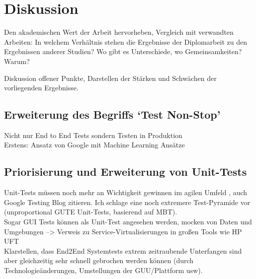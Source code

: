 \makeatletter\ifthesis@masterthesis
\chapter{Diskussion}
\label{sec:discussion}

Den akademischen Wert der Arbeit hervorheben, Vergleich mit verwandten Arbeiten: In welchem Verhältnis stehen die Ergebnisse der Diplomarbeit zu den Ergebnissen anderer Studien? Wo gibt es Unterschiede, wo Gemeinsamkeiten? Warum?

Diskussion offener Punkte, Darstellen der Stärken und Schwächen der vorliegenden Ergebnisse.


\section{Erweiterung des Begriffs `Test Non-Stop'}
Nicht nur End to End Tests sondern Testen in Produktion\\
Erstens: Ansatz von Google mit Machine Learning Ansätze

\section{Priorisierung und Erweiterung von Unit-Tests}
\label{sec:discussion_unit}
Unit-Tests müssen noch mehr an Wichtigkeit gewinnen im agilen Umfeld \cite{linz_testing_2014}, auch Google Testing Blog zitieren. Ich schlage eine noch extremere Test-Pyramide vor (unproportional GUTE Unit-Tests, basierend auf MBT).\\
Sogar GUI Tests können als Unit-Test angesehen werden, mocken von Daten und Umgebungen --> Verweis zu Service-Virtualisierungen in großen Tools wie HP UFT\\
Klarstellen, dass End2End Systemtests extrem zeitraubende Unterfangen sind aber gleichzeitig sehr schnell gebrochen werden können (durch Technologieänderungen, Umstellungen der GUU/Plattform usw).

